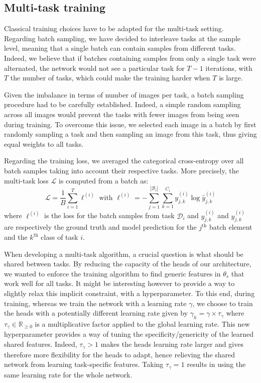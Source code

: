 \subsection{Multi-task training}
\label{ssec:mtask:multitask-training}

Classical training choices have to be adapted for the multi-task setting. Regarding batch sampling, we have decided to interleave tasks at the sample level, meaning that a single batch can contain samples from different tasks. Indeed, we believe that if batches containing samples from only a single task were alternated, the network would not see a particular task for $T-1$ iterations, with $T$ the number of tasks, which could make the training harder when $T$ is large.

Given the imbalance in terms of number of images per task, a batch sampling procedure had to be carefully established. Indeed, a simple random sampling across all images would prevent the tasks with fewer images from being seen during training. To overcome this issue, we selected each image in a batch by first randomly sampling a task and then sampling an image from this task, thus giving equal weights to all tasks.

Regarding the training loss, we averaged the categorical cross-entropy over all batch samples taking into account their respective tasks. More precisely, the multi-task loss $\mathcal{L}$ is computed from a batch as:
\begin{equation}\label{eqn:loss}
\mathcal{L} = \frac{1}{B} \sum_{i=1}^T \ell^{(i)} \mbox{ with } \ell^{(i)} = - \sum_{j=1}^{\left|\mathcal{B}_{i}\right|} \sum_{k=1}^{C_{i}} y^{(i)}_{j,k} \log \hat{y}^{(i)}_{j,k}
\end{equation}
where $\ell^{(i)}$ is the loss for the batch samples from task $\mathcal{D}_i$ and $y^{(i)}_{j,k}$ and $\hat{y}^{(i)}_{j,k}$ are respectively the ground truth and model prediction for the $j^{\text{th}}$ batch element and the $k^{\text{th}}$ class of task $i$.

When developing a multi-task algorithm, a crucial question is what should be shared between tasks. By reducing the capacity of the heads of our architecture, we wanted to enforce the training algorithm to find generic features in $\theta_s$ that work well for all tasks. It might be interesting however to provide a way to slightly relax this implicit constraint, with a hyperparameter. To this end, during training, whereas we train the network with a learning rate $\gamma$, we choose to train the heads with a potentially different learning rate given by $\gamma_h = \gamma \times \tau_\gamma$ where $\tau_\gamma \in \mathbb{R}_{\geq0}$ is a multiplicative factor applied to the global learning rate. This new hyperparameter provides a way of tuning the specificity/genericity of the learned shared features.  Indeed, $\tau_\gamma > 1$ makes the heads learning rate larger and gives therefore more flexibility for the heads to adapt, hence relieving the shared network from learning task-specific features. Taking $\tau_\gamma = 1$ results in using the same learning rate for the whole network.

